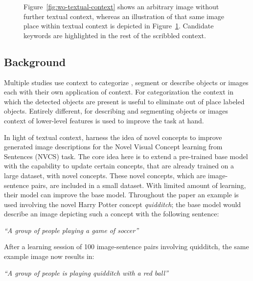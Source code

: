 \begin{figure}[h!]
\begin{subfigure}[b]{0.4\textwidth}
\begin{tikzpicture}
		\end{tikzpicture}
		\caption{}
		\label{fig:w-textual-context}
	\end{subfigure}
\caption{Figure~\ref{fig:wo-textual-context} shows an arbitrary image without further textual context, whereas an illustration of that same image place within textual context is depicted in Figure~\ref{fig:w-textual-context}. Candidate keywords are highlighted in the rest of the scribbled context.}
\label{fig:textual-context}
\end{figure}



\subsection{Background}
Multiple studies use context to categorize \cite{Rabinovich2007, carbonetto2004statistical}, segment \cite{Sande2011} or describe \cite{mao2015learning} objects or images each with their own application of context. For categorization the context in which the detected objects are present is useful to eliminate out of place labeled objects. Entirely different, for describing and segmenting objects or images context of lower-level features is used to improve the task at hand.

In light of textual context, \citeauthor{mao2015learning} \cite{mao2015learning} harness the idea of novel concepts to improve generated image descriptions for the Novel Visual Concept learning from Sentences (NVCS) task. The core idea here is to extend a pre-trained base model with the capability to update certain concepts, that are already trained on a large dataset, with novel concepts. These novel concepts, which are image-sentence pairs, are included in a small dataset. With limited amount of learning, their model can improve the base model. Throughout the paper an example is used involving the novel Harry Potter concept \emph{quidditch}; the base model would describe an image depicting such a concept with the following sentence:

\begin{displayquote}
	\emph{``A group of people playing a game of soccer''}
\end{displayquote}

After a learning session of 100 image-sentence pairs involving quidditch, the same example image now results in:

\begin{displayquote}
	\emph{``A group of people is playing quidditch with a red ball''}
\end{displayquote}

